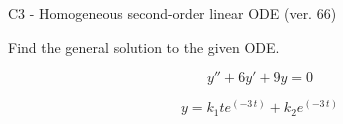 \begin{exercise}
  \begin{exerciseTitle}C3 - Homogeneous second-order linear ODE (ver. 66)\end{exerciseTitle}
  \begin{exerciseStatement}
    
Find the general solution to the given ODE.

    
\[y''+6y'+9y = 0\]

  \end{exerciseStatement}
  \begin{exerciseAnswer}
    
\[y= k_{1} t e^{\left(-3 \, t\right)} + k_{2} e^{\left(-3 \, t\right)}\]

  \end{exerciseAnswer}
\end{exercise}